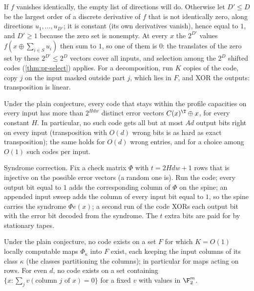 \begin{outline}
If $f$ vanishes identically, the empty list of directions will do. Otherwise let $D'\le D$ be the largest order of a
discrete derivative of $f$ that is not identically zero, along directions $u_1,\dots,u_{D'}$; it is constant
(its own derivatives vanish), hence equal to $1$, and $D'\ge1$ because the zero set is nonempty. At every
$x$ the $2^{D'}$ values $f(x\oplus\sum_{i\in S}u_i)$ then sum to $1$, so one of them is $0$: the translates of
the zero set by these $2^{D'}\le2^D$ vectors cover all inputs, and selection among the $2^D$ shifted codes
(\cref{thm:pr-select}) applies.
For a decomposition, run $K$ copies of the code, copy $j$ on the input masked outside part $j$, which
lies in $F$, and XOR the outputs: transposition is linear.
\end{outline}

\begin{theorem}[Errors]\label{thm:pr-errors}
Under the plain conjecture, every code that stays within the profile capacities on every input has
more than $2^{Hdw}$ distinct error vectors $C(x)^{\T}\oplus x$, for every constant $H$. In particular,
no such code gets all but at most $Ad$ output bits right on every input (transposition with $O(d)$
wrong bits is as hard as exact transposition); the same holds for $O(d)$ wrong entries, and for a
choice among $O(1)$ such codes per input.
\end{theorem}

\begin{outline}
Syndrome correction. Fix a check matrix $\Phi$ with $t=2Hdw+1$ rows that is injective on the possible
error vectors (a random one is). Run the code; every output bit equal to $1$ adds the corresponding
column of $\Phi$ on the spine; an appended input sweep adds the column of every input bit equal to $1$,
so the spine carries the syndrome $\Phi e(x)$; a second run of the code XORs each output bit with the
error bit decoded from the syndrome. The $t$ extra bits are paid for by stationary tapes.
\end{outline}

\begin{theorem}\label{thm:pr-columns}
Under the plain conjecture, no code exists on a set $F$ for which $K=O(1)$ locally computable maps
$\Phi_\kappa$ into $F$ exist, each keeping the input columns of its class $\kappa$ (the classes
partitioning the columns); in particular for maps acting on rows. For even $d$, no code exists on a set
containing $\{x:\sum_jv(\text{column }j\text{ of }x)=0\}$ for a fixed $v$ with values in $\F_2^m$.
\end{theorem}

